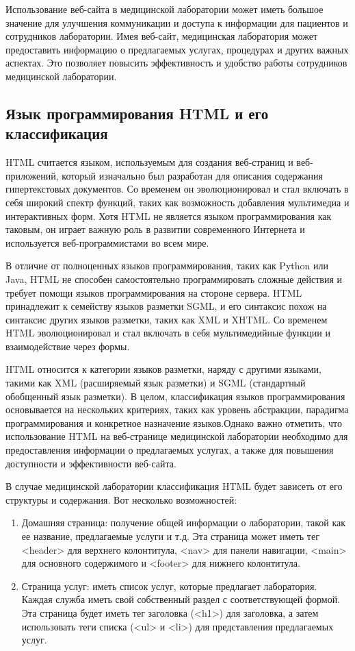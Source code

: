 Использование веб-сайта в медицинской лаборатории может иметь большое значение для улучшения коммуникации и доступа к информации для пациентов и сотрудников лаборатории. Имея веб-сайт, медицинская лаборатория может предоставить информацию о предлагаемых услугах, процедурах и других важных аспектах. Это позволяет повысить эффективность и удобство работы сотрудников медицинской лаборатории.

\subsection{Язык программирования HTML и его классификация}

HTML считается языком, используемым для создания веб-страниц и веб-приложений, который изначально был разработан для описания содержания гипертекстовых документов. Со временем он эволюционировал и стал включать в себя широкий спектр функций, таких как возможность добавления мультимедиа и интерактивных форм. Хотя HTML не является языком программирования как таковым, он играет важную роль в развитии современного Интернета и используется веб-программистами во всем мире.

В отличие от полноценных языков программирования, таких как Python или Java, HTML не способен самостоятельно программировать сложные действия и требует помощи языков программирования на стороне сервера. HTML принадлежит к семейству языков разметки SGML, и его синтаксис похож на синтаксис других языков разметки, таких как XML и XHTML. Со временем HTML эволюционировал и стал включать в себя мультимедийные функции и взаимодействие через формы.

HTML относится к категории языков разметки, наряду с другими языками, такими как XML (расширяемый язык разметки) и SGML (стандартный обобщенный язык разметки). В целом, классификация языков программирования основывается на нескольких критериях, таких как уровень абстракции, парадигма программирования и конкретное назначение языков.Однако важно отметить, что использование HTML на веб-странице медицинской лаборатории необходимо для предоставления информации о предлагаемых услугах, а также для повышения доступности и эффективности веб-сайта.

В случае медицинской лаборатории классификация HTML будет зависеть от его структуры и содержания. Вот несколько возможностей:

\begin{enumerate}
	\item Домашняя страница: получение общей информации о лаборатории, такой как ее название, предлагаемые услуги и т.д. Эта страница может иметь тег <header> для верхнего колонтитула, <nav> для панели навигации, <main> для основного содержимого и <footer> для нижнего колонтитула.
	\item Страница услуг: иметь список услуг, которые предлагает лаборатория. Каждая служба иметь свой собственный раздел с соответствующей формой. Эта страница будет иметь тег заголовка (<h1>) для заголовка, а затем использовать теги списка (<ul> и <li>) для представления предлагаемых услуг.
\end{enumerate}

